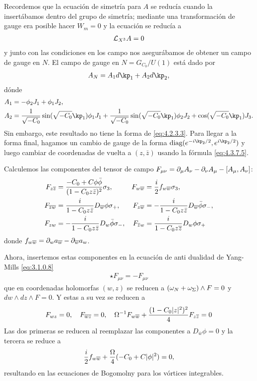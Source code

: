 Recordemos que la ecuación de simetría para $A$ se reducía cuando la insertábamos dentro del grupo de simetría; mediante una transformación de gauge era posible hacer $W_m=0$ y la ecuación se reducía a
\begin{align}
	\mathcal{L}_{X^3}A =0
\end{align}
y junto con las condiciones en los campo nos asegurábamos de obtener un campo de gauge en $N$. El campo de gauge en $N=G_{C_0}/U(1)$ está dado por
\begin{align}
	A_N = A_1 d\kp_1+A_2 d\kp_2,
\end{align}
dónde
\begin{align}
	A_1 &= -\phi_2 J_1+\phi_1 J_2,\\
	A_2 &= \f 1{\sqrt{-C_0}}\sin(\sqrt{-C_0}\kp_1)\phi_1 J_1+\f 1{\sqrt{-C_0}}\sin(\sqrt{-C_0}\kp_1)\phi_2 J_2+\cos(\sqrt{-C_0}\kp_1)J_3.
\end{align}
Sin embargo, este resultado no tiene la forma de \eqref{eq:4.2.3.3}. Para llegar a la forma final, hagamos un cambio de gauge de la forma $\text{diag}(e^{-i\kp_2/2},e^{i\kp_2/2})$ y luego cambiar de coordenadas de vuelta a $(z,\bar z)$ usando la fórmula \eqref{eq:4.3.7.5}.

Calculemos las componentes del tensor de campo $F_{\mu\nu}=\partial_\mu A_\nu-\partial_\nu A_\mu-[A_\mu,A_\nu]$:
\begin{align}
	F_{z\overline z} &= \frac{-C_0+C\phi\bar\phi}{(1-C_0z\bar z)^2}\sigma_3, & F_{w\overline w} &= \frac{i}{2} f_{w\overline w}\sigma_3,\\
	F_{\overline z\overline w} &= \frac{i}{1-C_0z\bar z}D_{\overline w}\phi\sigma_+, & F_{z\overline w} &= -\frac{i}{1-C_0z\bar z}D_{\overline w}\bar\phi \sigma_-,\\
	F_{zw} &= -\frac{i}{1-C_0 z\bar z}D_w\bar\phi\sigma_-, & F_{\overline zw} &=\frac{i}{1-C_0 z\overline z}D_w\phi\sigma_+
\end{align}
donde $f_{w\overline w}=\partial_w a_{\overline w}-\partial_{\overline w}a_w$.

Ahora, insertemos estas componentes en la ecuación de anti dualidad de Yang-Mills \eqref{eq:3.1.0.8}
\begin{align}
	\star F_{\mu\nu} = -F_{\mu\nu}
\end{align}
que en coordenadas holomorfas $(w,z)$ se reducen a $(\omega_N+\omega_\Sigma)\wedge F=0$ y $dw\wedge dz\wedge F=0$. Y estas a su vez se reducen a
\begin{align}
	F_{wz}=0, \ \ \ F_{\overline w\overline z}=0, \ \ \ \Om^{-1}F_{w\overline w}+\f{(1-C_0|z|^2)^2}4 F_{z\overline z} =0
\end{align}
Las dos primeras se reducen al reemplazar las componentes a $D_{\overline w}\phi=0$ y la tercera se reduce a
\begin{align}
	\frac{i}{2}f_{w\overline w}+\frac{\Omega}{4}(-C_0+C|\phi|^2) = 0,
\end{align}
resultando en las ecuaciones de Bogomolny para los vórtices integrables.


